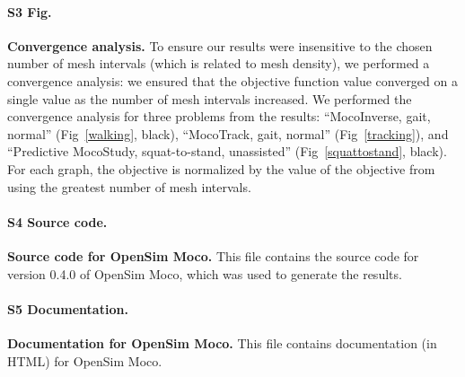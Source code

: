 \documentclass[10pt,letterpaper]{article}
\begin{document}
\paragraph*{S3 Fig.}
\label{S3_Fig}
{\bf Convergence analysis.}
To ensure our results were insensitive to the chosen number of mesh intervals (which is related to mesh density), we performed a convergence analysis: we ensured that the objective function value converged on a single value as the number of mesh intervals increased. We performed the convergence analysis for three problems from the results: ``MocoInverse, gait, normal'' (Fig~\ref{walking}, black), ``MocoTrack, gait, normal'' (Fig~\ref{tracking}), and ``Predictive MocoStudy, squat-to-stand, unassisted'' (Fig~\ref{squattostand}, black). For each graph, the objective is normalized by the value of the objective from using the greatest number of mesh intervals.

\paragraph*{S4 Source code.}
\label{S4_SourceCode}
{\bf Source code for OpenSim Moco.} This file contains the source code for version 0.4.0 of OpenSim Moco, which was used to generate the results.

\paragraph*{S5 Documentation.}
\label{S5_Documentatino}
{\bf Documentation for OpenSim Moco.} This file contains documentation (in HTML) for OpenSim Moco.

\nolinenumbers

%
%
%



%
%
%
%
\end{document}
